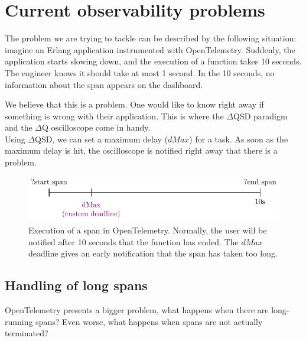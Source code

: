 \section{Current observability problems}
    The problem we are trying to tackle can be described by the following situation: 
    imagine an Erlang application instrumented with OpenTelemetry. Suddenly, the application starts slowing down, and the execution of a function takes 10 seconds. The engineer knows it should take at most 1 second. In the 10 seconds, no information about the span appears on the dashboard.
    
    We believe that this is a problem. One would like to know right away if something is wrong with their application. This is where the $\Delta$QSD paradigm and the $\Delta$Q oscilloscope come in handy. \\ 
   Using $\Delta$QSD, we can set a maximum delay ($dMax$) for a task. As soon as the maximum delay is hit, the oscilloscope is notified right away that there is a problem.
   
   \begin{figure}[H]
        \begin{center}
            \includegraphics{tikz/start_end_dmax.pdf}
        \end{center}
        \caption{Execution of a span in OpenTelemetry. Normally, the user will be notified after 10 seconds that the function has ended. The $dMax$ deadline gives an early notification that the span has taken too long.}
        \label{fig:otel_dmax}
    \end{figure} 


    \subsection{Handling of long spans} \label{subsec:long_spans}
        OpenTelemetry presents a bigger problem, what happens when there are long-running spans? Even worse, what happens when spans are not actually terminated?
        
